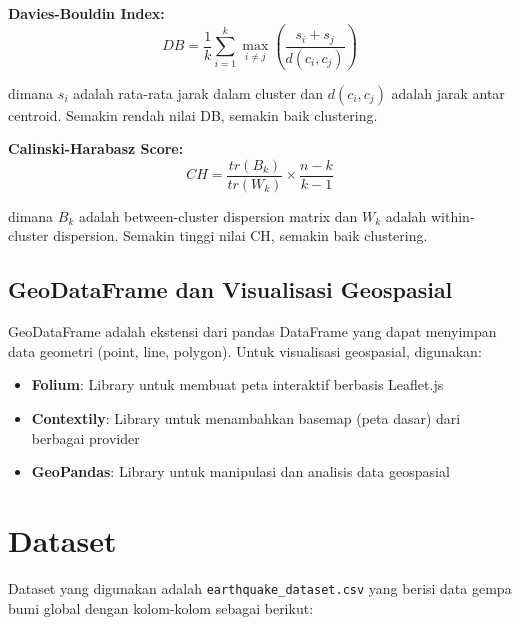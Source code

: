 \documentclass[12pt,a4paper]{article}
\begin{document}
\textbf{Davies-Bouldin Index:}
\begin{equation}
DB = \frac{1}{k}\sum_{i=1}^{k}\max_{i \neq j}\left(\frac{s_i + s_j}{d(c_i, c_j)}\right)
\end{equation}

dimana $s_i$ adalah rata-rata jarak dalam cluster dan $d(c_i, c_j)$ adalah jarak antar centroid. Semakin rendah nilai DB, semakin baik clustering.

\textbf{Calinski-Harabasz Score:}
\begin{equation}
CH = \frac{tr(B_k)}{tr(W_k)} \times \frac{n-k}{k-1}
\end{equation}

dimana $B_k$ adalah between-cluster dispersion matrix dan $W_k$ adalah within-cluster dispersion. Semakin tinggi nilai CH, semakin baik clustering.

\subsection{GeoDataFrame dan Visualisasi Geospasial}
GeoDataFrame adalah ekstensi dari pandas DataFrame yang dapat menyimpan data geometri (point, line, polygon). Untuk visualisasi geospasial, digunakan:

\begin{itemize}
    \item \textbf{Folium}: Library untuk membuat peta interaktif berbasis Leaflet.js
    \item \textbf{Contextily}: Library untuk menambahkan basemap (peta dasar) dari berbagai provider
    \item \textbf{GeoPandas}: Library untuk manipulasi dan analisis data geospasial
\end{itemize}

\section{Dataset}

Dataset yang digunakan adalah \texttt{earthquake\_dataset.csv} yang berisi data gempa bumi global dengan kolom-kolom sebagai berikut:
\end{document}

